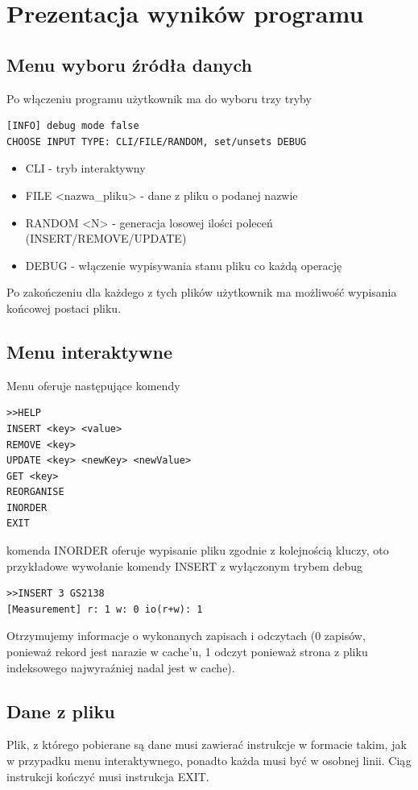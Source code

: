 \documentclass{article}
\begin{document}
\section{Prezentacja wyników programu}
\subsection{Menu wyboru źródła danych}
Po włączeniu programu użytkownik ma do wyboru trzy tryby
\begin{lstlisting}
[INFO] debug mode false
CHOOSE INPUT TYPE: CLI/FILE/RANDOM, set/unsets DEBUG
\end{lstlisting}
\begin{itemize}
	\item CLI - tryb interaktywny
	\item FILE <nazwa\_pliku> - dane z pliku o podanej nazwie
	\item RANDOM <N> - generacja losowej ilości poleceń (INSERT/REMOVE/UPDATE)
	\item DEBUG - włączenie wypisywania stanu pliku co każdą operację
\end{itemize}
Po zakończeniu dla każdego z tych plików użytkownik ma możliwość wypisania końcowej postaci pliku.
\subsection{Menu interaktywne}
Menu oferuje następujące komendy
\begin{lstlisting}
>>HELP
INSERT <key> <value>
REMOVE <key>
UPDATE <key> <newKey> <newValue>
GET <key>
REORGANISE
INORDER
EXIT
\end{lstlisting}
komenda INORDER oferuje wypisanie pliku zgodnie z kolejnością kluczy,
oto przykładowe wywołanie komendy INSERT z wyłączonym trybem debug
\begin{lstlisting}
>>INSERT 3 GS2138
[Measurement] r: 1 w: 0 io(r+w): 1
\end{lstlisting}
Otrzymujemy informacje o wykonanych zapisach i odczytach (0 zapisów, ponieważ rekord jest narazie w cache'u, 1 odczyt ponieważ strona z pliku indeksowego najwyraźniej nadal jest w cache).
\subsection{Dane z pliku}
Plik, z którego pobierane są dane musi zawierać instrukcje w formacie takim, jak w przypadku menu interaktywnego, ponadto każda musi być w osobnej linii. Ciąg instrukcji kończyć musi instrukcja EXIT.
\end{document}
